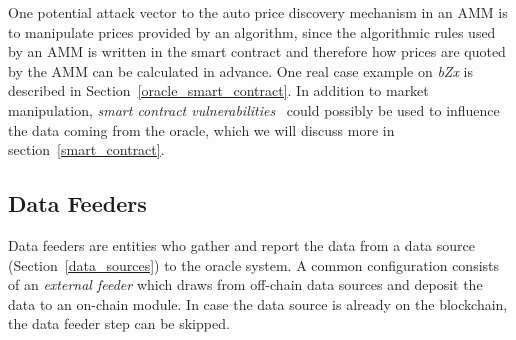 
One potential attack vector to the auto price discovery mechanism in an AMM is to manipulate prices provided by an algorithm, since the algorithmic rules used by an AMM is written in the smart contract and therefore how prices are quoted by the AMM can be calculated in advance. One real case example on \textit{bZx} is described in Section~\ref{oracle_smart_contract}. In addition to market manipulation, \textit{smart contract vulnerabilities}~\cite{atzei2017survey,chen2020survey} could possibly be used to influence the data coming from the oracle, which we will discuss more in section~\ref{smart_contract}.





\subsection{Data Feeders}\label{data_feeders} 

Data feeders are entities who gather and report the data from a data source (Section~\ref{data_sources}) to the oracle system. 
A common configuration consists of an \textit{external feeder} which draws from off-chain data sources and deposit the data to an on-chain module. In case the data source is already on the blockchain, the data feeder step can be skipped.

